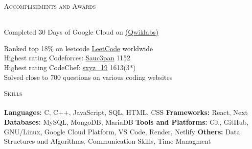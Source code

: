 \documentclass[a4paper]{article}
\newcommand{\lineunder} {
    \vspace*{-8pt} \\
    \hspace*{-18pt} \hrulefill \\
}
\newcommand{\header} [1] {
    {\hspace*{-18pt}\vspace*{6pt} \textsc{#1}}
    \vspace*{-6pt} \lineunder
}
\begin{document}



\header{Accomplishments and Awards}
\vspace{1mm}

Completed 30 Days of Google Cloud on \href{https://www.cloudskillsboost.google/public_profiles/54973de6-1c14-4bf0-8b25-74fcef00e770}{(Qwiklabs)}  \\
\vspace*{1mm}

Ranked top 18\% on leetcode \href{https://leetcode.com/saucepan_/}{LeetCode} worldwide\\
\vspace*{1mm}
Highest rating Codeforces: \href{https://codeforces.com/profile/Sauc3pan}{Sauc3pan} 1152\\
\vspace*{1mm}
Highest rating CodeChef:  \href{https://www.codechef.com/users/sxyz_19}{sxyz\_19} 1613(3*)\\
\vspace*{1mm}
Solved close to 700 questions on various coding websites\\
\vspace*{1mm}





\header{Skills}
\vspace{1mm}
\textbf{Languages:} C, C++, JavaScript, SQL, HTML, CSS
\quad \textbf{Frameworks:} React, Next
\quad \textbf{Databases:} MySQL, MongoDB, MariaDB
\quad \textbf{Tools and Platforms:} Git, GitHub, GNU/Linux, Google Cloud Platform, VS Code, Render, Netlify
\quad \textbf{Others:} Data Structures and Algorithms, Communication Skills, Time Managment

\vspace{1.5mm}
\end{document}

